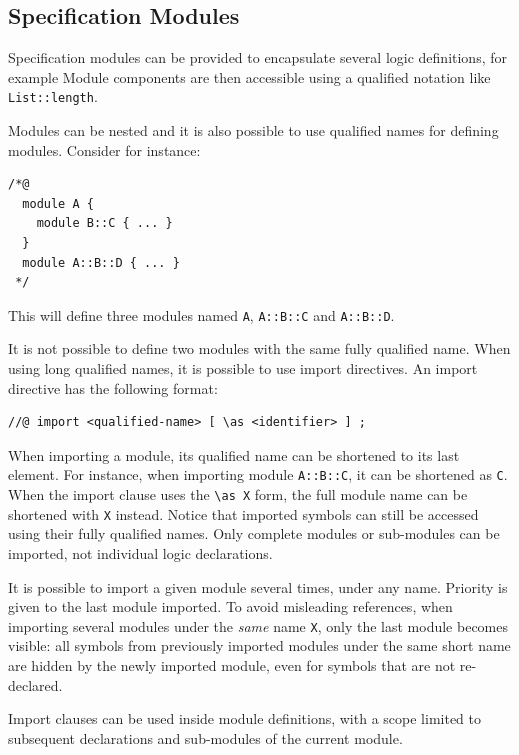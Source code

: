 \subsection{Specification Modules}
\label{sec:specmodules}

\experimental


Specification modules can be provided to encapsulate
several logic definitions, for example
Module components are then accessible using a qualified notation like
\lstinline|List::length|.

Modules can be nested and it is also possible to use qualified names
for defining modules. Consider for instance:
\begin{lstlisting}
/*@
  module A {
    module B::C { ... }
  }
  module A::B::D { ... }
 */
\end{lstlisting}
This will define three modules named \verb+A+, \verb+A::B::C+ and
\verb+A::B::D+.

It is not possible to define two modules with the same fully qualified name.
When using long qualified names, it is possible to use import directives. An
import directive has the following format:

\begin{lstlisting}
//@ import <qualified-name> [ \as <identifier> ] ;
\end{lstlisting}

When importing a module, its qualified name can be shortened to its last
element. For instance, when importing module \verb+A::B::C+, it can be shortened
as \verb+C+. When the import clause uses the \verb+\as X+ form, the full module
name can be shortened with \verb+X+ instead. Notice that imported symbols can
still be accessed using their fully qualified names. Only complete modules or
sub-modules can be imported, not individual logic declarations.

It is possible to import a given module several times, under any name. Priority
is given to the last module imported. To avoid misleading references, when
importing several modules under the \emph{same} name \verb+X+, only the last
module becomes visible: all symbols from previously imported modules under the
same short name are hidden by the newly imported module, even for symbols that
are not re-declared.

Import clauses can be used inside module definitions, with a scope limited to
subsequent declarations and sub-modules of the current module.

